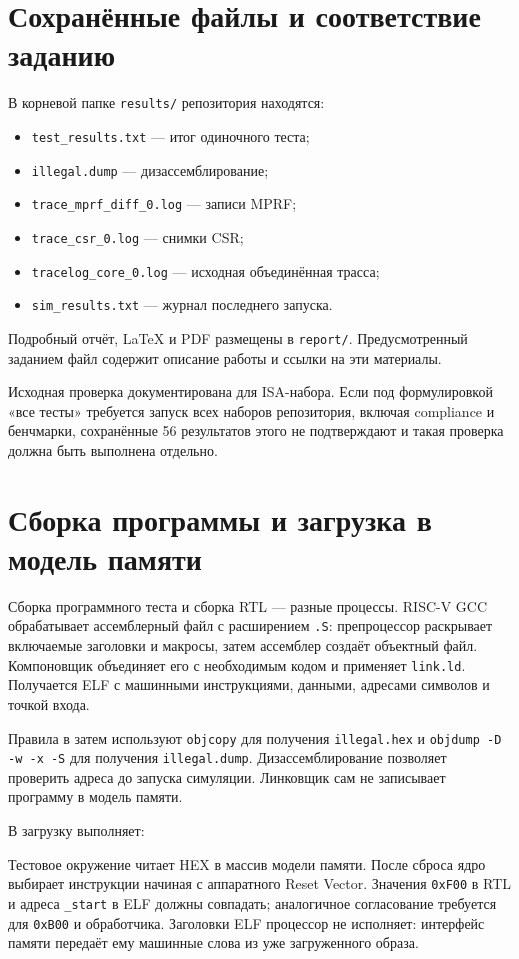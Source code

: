 \documentclass[12pt,a4paper]{article}
\begin{document}
\section{Сохранённые файлы и соответствие заданию}
В корневой папке \texttt{results/} репозитория находятся:
\begin{itemize}
\item \texttt{test\_results.txt} --- итог одиночного теста;
\item \texttt{illegal.dump} --- дизассемблирование;
\item \texttt{trace\_mprf\_diff\_0.log} --- записи MPRF;
\item \texttt{trace\_csr\_0.log} --- снимки CSR;
\item \texttt{tracelog\_core\_0.log} --- исходная объединённая трасса;
\item \texttt{sim\_results.txt} --- журнал последнего запуска.
\end{itemize}
Подробный отчёт, LaTeX и PDF размещены в \texttt{report/}.
Предусмотренный заданием файл 
содержит описание работы и ссылки на эти материалы.

Исходная проверка документирована для ISA-набора. Если под формулировкой
«все тесты» требуется запуск всех наборов репозитория, включая compliance
и бенчмарки, сохранённые 56 результатов этого не подтверждают и такая
проверка должна быть выполнена отдельно.


\section{Сборка программы и загрузка в модель памяти}
Сборка программного теста и сборка RTL --- разные процессы.
RISC-V GCC обрабатывает ассемблерный файл с расширением \texttt{.S}:
препроцессор раскрывает включаемые заголовки и макросы, затем ассемблер
создаёт объектный файл. Компоновщик объединяет его с необходимым кодом
и применяет \texttt{link.ld}. Получается ELF с машинными инструкциями,
данными, адресами символов и точкой входа.

Правила в  затем используют
\texttt{objcopy} для получения \texttt{illegal.hex} и
\texttt{objdump -D -w -x -S} для получения \texttt{illegal.dump}.
Дизассемблирование позволяет проверить адреса до запуска симуляции.
Линковщик сам не записывает программу в модель памяти.

В  загрузку выполняет:
Тестовое окружение читает HEX в массив модели памяти.
После сброса ядро выбирает инструкции начиная с аппаратного Reset Vector.
Значения \texttt{0xF00} в RTL и адреса \texttt{\_start} в ELF должны совпадать;
аналогичное согласование требуется для \texttt{0xB00} и обработчика.
Заголовки ELF процессор не исполняет: интерфейс памяти передаёт ему
машинные слова из уже загруженного образа.
\end{document}
